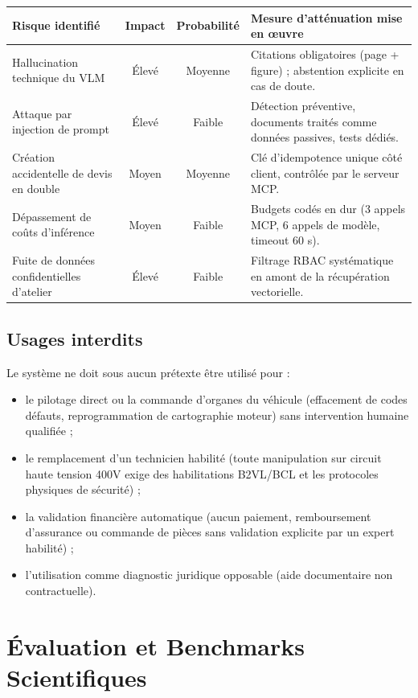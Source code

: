 \documentclass[11pt,a4paper]{article}
\begin{document}
\begin{tabularx}{\textwidth}{l c c X}
\toprule
Risque identifié & Impact & Probabilité & Mesure d'atténuation mise en œuvre \\
\midrule
Hallucination technique du VLM & Élevé & Moyenne & Citations obligatoires (page + figure) ; abstention explicite en cas de doute. \\
Attaque par injection de prompt & Élevé & Faible & Détection préventive, documents traités comme données passives, tests dédiés. \\
Création accidentelle de devis en double & Moyen & Moyenne & Clé d'idempotence unique côté client, contrôlée par le serveur MCP. \\
Dépassement de coûts d'inférence & Moyen & Faible & Budgets codés en dur (3 appels MCP, 6 appels de modèle, timeout 60 s). \\
Fuite de données confidentielles d'atelier & Élevé & Faible & Filtrage RBAC systématique en amont de la récupération vectorielle. \\
\bottomrule
\end{tabularx}

\subsection{Usages interdits}
Le système ne doit sous aucun prétexte être utilisé pour :
\begin{itemize}[leftmargin=*]
  \item le pilotage direct ou la commande d'organes du véhicule (effacement de codes défauts, reprogrammation de cartographie moteur) sans intervention humaine qualifiée ;
  \item le remplacement d'un technicien habilité (toute manipulation sur circuit haute tension 400V exige des habilitations B2VL/BCL et les protocoles physiques de sécurité) ;
  \item la validation financière automatique (aucun paiement, remboursement d'assurance ou commande de pièces sans validation explicite par un expert habilité) ;
  \item l'utilisation comme diagnostic juridique opposable (aide documentaire non contractuelle).
\end{itemize}

\section{Évaluation et Benchmarks Scientifiques}
\end{document}
